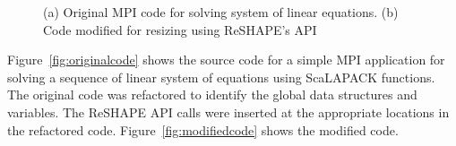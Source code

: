 \documentclass[letterpaper]{llncs}
\begin{document}
\begin{figure}[!ht]
\begin{center}
\end{center}
\caption{(a) Original MPI code for solving system of linear equations. (b) Code modified for resizing using ReSHAPE's API}
\end{figure}

Figure~\ref{fig:originalcode} shows the source code for a simple MPI application for solving a sequence of linear system of equations using ScaLAPACK functions.
The original code was refactored to identify the global data structures and variables. The ReSHAPE API calls were inserted at the appropriate locations in the refactored code.
Figure~\ref{fig:modifiedcode} shows the modified code. 
\end{document}

